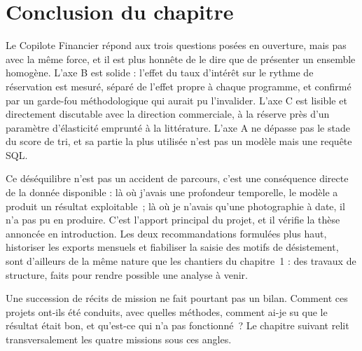 \hypertarget{conclusion-du-chapitre}{%
\section{Conclusion du chapitre}\label{conclusion-du-chapitre}}

Le Copilote Financier répond aux trois questions posées en ouverture, mais pas avec la même
force, et il est plus honnête de le dire que de présenter un ensemble homogène. L'axe B est
solide : l'effet du taux d'intérêt sur le rythme de réservation est mesuré, séparé de l'effet
propre à chaque programme, et confirmé par un garde-fou méthodologique qui aurait pu
l'invalider. L'axe C est lisible et directement discutable avec la direction commerciale, à la
réserve près d'un paramètre d'élasticité emprunté à la littérature. L'axe A ne dépasse pas le
stade du score de tri, et sa partie la plus utilisée n'est pas un modèle mais une requête SQL.

Ce déséquilibre n'est pas un accident de parcours, c'est une conséquence directe de la donnée
disponible : là où j'avais une profondeur temporelle, le modèle a produit un résultat
exploitable~; là où je n'avais qu'une photographie à date, il n'a pas pu en produire. C'est
l'apport principal du projet, et il vérifie la thèse annoncée en introduction. Les deux
recommandations formulées plus haut, historiser les exports mensuels et fiabiliser la saisie
des motifs de désistement, sont d'ailleurs de la même nature que les chantiers du chapitre~1 :
des travaux de structure, faits pour rendre possible une analyse à venir.

Une succession de récits de mission ne fait pourtant pas un bilan. Comment ces projets
ont-ils été conduits, avec quelles méthodes, comment ai-je su que le résultat était bon, et
qu'est-ce qui n'a pas fonctionné~? Le chapitre suivant relit transversalement les quatre
missions sous ces angles.
